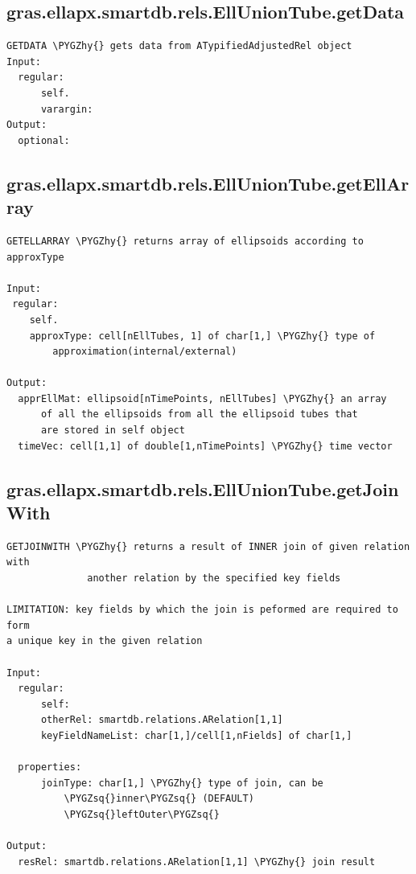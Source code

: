 \documentclass[letterpaper,10pt,english]{sphinxmanual}
\def\PYGZhy{\char`\-}
\def\PYGZsq{\char`\'}
\begin{document}
\subsection{gras.ellapx.smartdb.rels.EllUnionTube.getData}
\label{chap_functions:gras-ellapx-smartdb-rels-elluniontube-getdata}
\begin{Verbatim}[commandchars=\\\{\}]
GETDATA \PYGZhy{} gets data from ATypifiedAdjustedRel object
Input:
  regular:
      self.
      varargin:
Output:
  optional:
\end{Verbatim}


\subsection{gras.ellapx.smartdb.rels.EllUnionTube.getEllArray}
\label{chap_functions:gras-ellapx-smartdb-rels-elluniontube-getellarray}
\begin{Verbatim}[commandchars=\\\{\}]
GETELLARRAY \PYGZhy{} returns array of ellipsoids according to
approxType

Input:
 regular:
    self.
    approxType: cell[nEllTubes, 1] of char[1,] \PYGZhy{} type of
        approximation(internal/external)

Output:
  apprEllMat: ellipsoid[nTimePoints, nEllTubes] \PYGZhy{} an array
      of all the ellipsoids from all the ellipsoid tubes that
      are stored in self object
  timeVec: cell[1,1] of double[1,nTimePoints] \PYGZhy{} time vector
\end{Verbatim}


\subsection{gras.ellapx.smartdb.rels.EllUnionTube.getJoinWith}
\label{chap_functions:gras-ellapx-smartdb-rels-elluniontube-getjoinwith}
\begin{Verbatim}[commandchars=\\\{\}]
GETJOINWITH \PYGZhy{} returns a result of INNER join of given relation with
              another relation by the specified key fields

LIMITATION: key fields by which the join is peformed are required to form
a unique key in the given relation

Input:
  regular:
      self:
      otherRel: smartdb.relations.ARelation[1,1]
      keyFieldNameList: char[1,]/cell[1,nFields] of char[1,]

  properties:
      joinType: char[1,] \PYGZhy{} type of join, can be
          \PYGZsq{}inner\PYGZsq{} (DEFAULT)
          \PYGZsq{}leftOuter\PYGZsq{}

Output:
  resRel: smartdb.relations.ARelation[1,1] \PYGZhy{} join result
\end{Verbatim}
\end{document}

